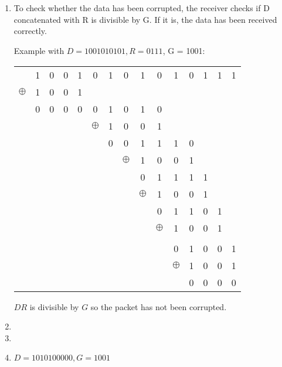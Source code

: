 \documentclass[12pt, a4paper]{article}
\begin{document}
\section{} %
\begin{enumerate}[a]
	\item %
	To check whether the data has been corrupted, the receiver checks if D concatenated with R is divisible by G. If it is, the data has been received correctly.

	Example with $D = 1001010101, R = 0111$, G = 1001:

	\begin{tabular}{ccccccccccccccc}
		& 1 & 0 & 0 & 1 & 0 & 1 & 0 & 1 & 0 & 1 & 0 & 1 & 1 & 1\\
		$\oplus$ & 1 & 0 & 0 & 1\\\cline{2-5}
		& 0 & 0 & 0 & 0 & 0 & 1 & 0 & 1 & 0\\
		&&&&& $\oplus$ & 1 & 0 & 0 & 1\\\cline{7-10}
		&&&&&& 0 & 0 & 1 & 1 & 1 & 0\\
		&&&&&&& $\oplus$ & 1 & 0 & 0 & 1\\\cline{9-12}
		&&&&&&&& 0 & 1 & 1 & 1 & 1\\
		&&&&&&&& $\oplus$ & 1 & 0 & 0 & 1\\\cline{10-13}
		&&&&&&&&& 0 & 1 & 1 & 0 & 1\\
		&&&&&&&&& $\oplus$ & 1 & 0 & 0 & 1\\\cline{11-14}
		&&&&&&&&&& \\
		&&&&&&&&&& 0 & 1 & 0 & 0 & 1\\
		&&&&&&&&&& $\oplus$ & 1 & 0 & 0 & 1\\\cline{12-15}
		&&&&&&&&&&& 0 & 0 & 0 & 0\\
	\end{tabular}

	$DR$ is divisible by $G$ so the packet has not been corrupted.
	\item %
	\item %
	\item %
	$D = 1010100000, G = 1001$


\end{enumerate}
\end{document}
